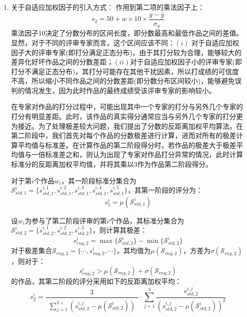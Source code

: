 \documentclass[12pt, onecolumn]{article}
\begin{document}
\begin{enumerate}
		\item 关于自适应加权因子的引入方式：
		作用到第二项的乘法因子上：
			\begin{equation*}
			s_2=50+w\times10\times\frac{y-\bar{y}}{\sigma_y}
			\end{equation*}
			乘法因子10决定了分数分布的区间长度，即分数最高和最低作品之间的差值。显然，对于不同的评审专家而言，这个区间应该不同：$(i)$ 对于自适应加权因子大的评审专家(即打分满足正态分布)，由于其打分较为合理，能够较大的差异化好坏作品之间的分数差距；$(ii)$对于自适应加权因子小的评审专家(即打分不满足正态分布)，其打分可能存在其他干扰因素，所以打成绩的可信度不高，所以缩小不同作品之间的分数差距(即分数分布区间较小)，能够避免误判的情况发生，因为此时作品的最终成绩受该评审专家的影响较小。
			
		在专家对作品的打分过程中，可能出现其中一个专家的打分与另外几个专家的打分有明显差距。此时，该作品的真实得分通常应当与另外几个专家的打分更为接近。为了处理极差较大问题，我们提出了分数的反距离加权平均算法。在第二阶段中，我们首先对每个作品的分数极差进行计算，进而对所有的极差计算平均值与标准差。在计算作品的第二阶段得分时，若作品的极差大于极差平均值与一倍标准差之和，则认为出现了专家对作品打分异常的情况，此时计算标准分的反距离加权平均值，并将其乘以3作为作品第二阶段得分。
		
		对于第$i$个作品$w_i$，其一阶段标准分集合为$\mathcal{S}^i_{std,1}=\{s^{i,1}_{std,1},s^{i,2}_{std,1},s^{i,3}_{std,1},s^{i,4}_{std,1},s^{i,5}_{std,1}\}$，其第一阶段的评分为：
		\begin{equation*}
		s^i_1=\mu\left( \mathcal{S}^i_{std,1}\right) 
		\end{equation*}
		
		设$w_i$为参与了第二阶段评审的第$i$个作品，其标准分集合为$\mathcal{S}^i_{std,2}=\{s^{i,1}_{std,2},s^{i,2}_{std,2},s^{i,3}_{std,2}\}$，则计算其极差：
		\begin{equation*}
		s_{rng,2}^i=\max\{\mathcal{S}^i_{std,2}\}-\min\{\mathcal{S}^i_{std,2}\}
		\end{equation*}
		对于极差集合$\mathcal{S}_{rng,2}=\{\cdots,s^{i}_{rng,2},\cdots\}$，其均值为$\mu\left( \mathcal{S}_{rng,2}\right) $，方差为$\sigma\left(\mathcal{S}_{rng,2} \right) $，则对于：
		\begin{equation*}
		s^i_{rng,2}>\mu\left( \mathcal{S}_{rng,2}\right)+\sigma\left(\mathcal{S}_{rng,2} \right)
		\end{equation*}
		的作品，其第二阶段的评分采用如下的反距离加权平均：
		\begin{equation*}
		s^i_2=\frac{3}{\begin{aligned}
			\sum_{j=1}^{
				3\times
			}\left( s^{i,j}_{std,2}-\mu\left(\mathcal{S}^i_{std,2} \right)\right) 
			\end{aligned}}
		\cdot\sum_{j=1}^{3}\frac{s^{i,j}_{std,2}}{\left( s^{i,j}_{std,2}-\mu\left(\mathcal{S}^{i}_{std,2} \right) \right) ^2} 
		\end{equation*}
		\end{enumerate}
	
\end{document}
